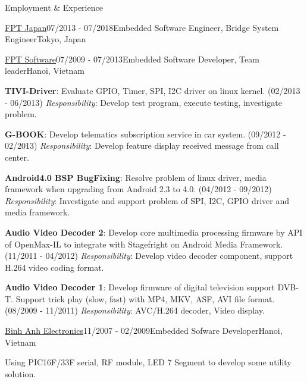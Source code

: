 \documentclass{resume}
\begin{document}
\begin{rSection}{Employment \& Experience}
\begin{rSubsection}{\href{https://www.fpt-software.jp/company-information/fpt-japan/}{\underline{FPT Japan}}}{07/2013 - 07/2018}{Embedded Software Engineer, Bridge System Engineer}{Tokyo, Japan}
    \end{rSubsection}

    \begin{rSubsection}{\href{https://www.fpt-software.com/}{\underline{FPT Software}}}{07/2009 - 07/2013}{Embedded Software Developer, Team leader}{Hanoi, Vietnam}
    \item \textbf{TIVI-Driver}: Evaluate GPIO, Timer, SPI, I2C driver on linux kernel. (02/2013 - 06/2013)
    \newline \textit{Responsibility}: Develop test program, execute testing, investigate problem.

    \item \textbf{G-BOOK}: Develop telematics subscription service in car system. (09/2012 - 02/2013)
    \newline \textit{Responsibility}: Develop feature display received message from call center.

    \item \textbf{Android4.0 BSP BugFixing}: Resolve problem of linux driver, media framework when upgrading from Android 2.3 to 4.0. (04/2012 - 09/2012)
    \newline \textit{Responsibility}: Investigate and support problem of SPI, I2C, GPIO driver and media framework. 

    \item \textbf{Audio Video Decoder 2}: Develop core multimedia processing firmware by API of OpenMax-IL to integrate with Stagefright on Android Media Framework. (11/2011 - 04/2012)
    \newline \textit{Responsibility}: Develop video decoder component, support H.264 video coding format.

    \item \textbf{Audio Video Decoder 1}: Develop firmware of digital television support DVB-T. Support trick play (slow, fast) with MP4, MKV, ASF, AVI file format. (08/2009 - 11/2011)
    \newline \textit{Responsibility}: AVC/H.264 decoder, Video display.
    \end{rSubsection}

    \begin{rSubsection}{\href{https://bagps.vn/}{\underline{Binh Anh Electronics}}}{11/2007 - 02/2009}{Embedded Sofware Developer}{Hanoi, Vietnam}
    \item Using PIC16F/33F serial, RF module, LED 7 Segment to develop some utility solution.
    \end{rSubsection}

  \end{rSection}
\end{document}
